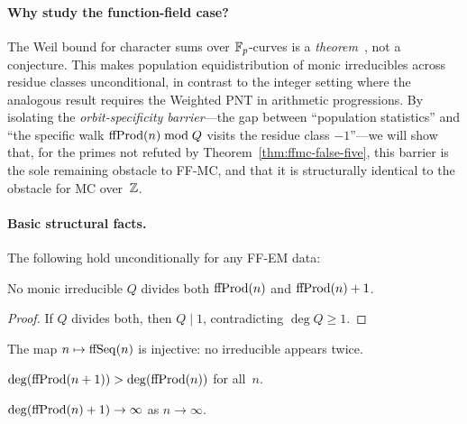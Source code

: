 \paragraph{Why study the function-field case?}
The Weil bound for character sums over $\mathbb{F}_p$-curves is a
\emph{theorem}~\cite{Weil1948,Deligne1980}, not a conjecture.  This
makes population equidistribution of monic irreducibles across residue
classes unconditional, in contrast to the integer setting where the
analogous result requires the Weighted PNT in arithmetic progressions.
By isolating the \emph{orbit-specificity barrier}---the gap between
``population statistics'' and ``the specific walk
$\mathrm{ffProd}(n) \bmod Q$ visits the residue class $-1$''---we will show
that, for the primes not refuted by Theorem~\ref{thm:ffmc-false-five},
this barrier is the sole remaining obstacle to FF-MC, and that it is
structurally identical to the obstacle for MC over~$\mathbb{Z}$.

\paragraph{Basic structural facts.}
The following hold unconditionally for any FF-EM data:

\begin{lemma}
\label{lem:ff-coprime}
No monic irreducible $Q$ divides both $\mathrm{ffProd}(n)$ and $\mathrm{ffProd}(n)+1$.
\end{lemma}

\begin{proof}
If $Q$ divides both, then $Q \mid 1$, contradicting $\deg Q \geq 1$.
\end{proof}

\begin{lemma}
\label{lem:ff-injective}
The map $n \mapsto \mathrm{ffSeq}(n)$ is injective: no irreducible appears
twice.
\end{lemma}

\begin{lemma}
\label{lem:ff-degree-growth}
$\deg(\mathrm{ffProd}(n+1)) > \deg(\mathrm{ffProd}(n))$ for all~$n$.
\end{lemma}

\begin{lemma}
\label{lem:ff-pool}
$\deg(\mathrm{ffProd}(n)+1) \to \infty$ as $n \to \infty$.
\end{lemma}


